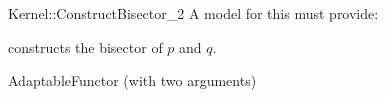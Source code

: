 \begin{ccRefFunctionObjectConcept}{Kernel::ConstructBisector_2}
A model for this must provide:


{constructs the bisector of $p$ and $q$.}

\ccRefines
AdaptableFunctor (with two arguments)

\end{ccRefFunctionObjectConcept}
